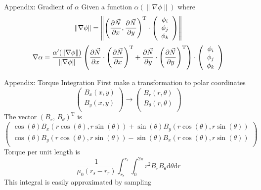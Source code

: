 \documentclass{beamer}
\newcommand\norm[1]{\left\lVert#1\right\rVert}
\begin{document}
    \begin{frame}[fragile]{Appendix: Gradient of $\alpha$}
        Given a function $\alpha(\|\nabla\phi\|)$ where
        \[\norm{\nabla\phi}=\norm{\left(\pdv{\vec{N}}{x}, \pdv{\vec{N}}{y} \right)^{\text{T}}\cdot \left(
        \begin{array}{c}
            \phi _i \\
            \phi _j \\
            \phi _k \\
        \end{array}
        \right)}\]
        \[\nabla\alpha=\frac{\alpha'(\norm{\nabla\phi})}{\norm{\nabla\phi}}
        \left(\pdv{\vec{N}}{x}\cdot\left(\pdv{\vec{N}}{x}\right)^{\text{T}}+
        \pdv{\vec{N}}{y}\cdot\left(\pdv{\vec{N}}{y}\right)^{\text{T}}\right)\cdot \left(
        \begin{array}{c}
            \phi _i \\
            \phi _j \\
            \phi _k \\
        \end{array}
        \right)\]
    \end{frame}
    \begin{frame}{Appendix: Torque Integration}
        First make a transformation to polar coordinates
        \[\left(
        \begin{array}{c}
            B_x(x,y) \\
            B_y(x,y) \\
        \end{array}
        \right) \to \left(
        \begin{array}{c}
            B_r(r,\theta) \\
            B_{\theta}(r,\theta) \\
        \end{array}
        \right) \]
        The vector $\left( B_r,\,B_{\theta} \right)^{\text{T}}$ is
        \[\left(
        \begin{array}{c}
            \cos (\theta )B_x(r \cos (\theta ),r \sin (\theta ))+\sin (\theta )B_y(r \cos (\theta ),r \sin (\theta )) \\
            \cos (\theta )B_y(r \cos (\theta ),r \sin (\theta ))-\sin (\theta )B_x(r \cos (\theta ),r \sin (\theta )) \\
        \end{array}
        \right)\]
        Torque per unit length is
        \[
            \frac{1}{\mu_0 (r_s-r_r)}\int_{r_r}^{r_s}\int_{0}^{2\pi} r^{2}B_r B_{\theta}\mathrm{d}\theta\mathrm{d}r
        \]
        This integral is easily approximated by sampling
    \end{frame}
\end{document}
